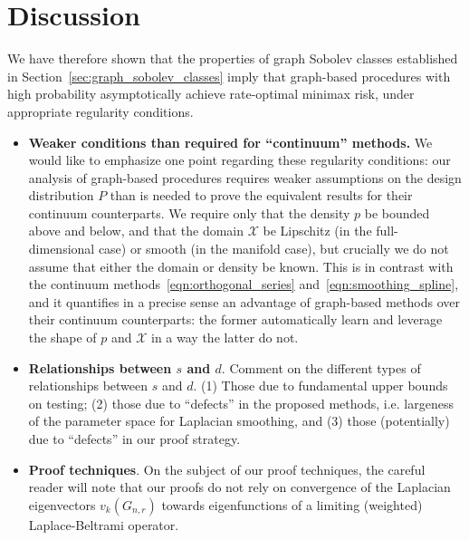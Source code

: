 \documentclass{article}
\newcommand{\1}{\mathbf{1}}
\newcommand{\Xset}{\mathcal{X}}
\theoremstyle{alden}
\theoremstyle{aldenthm}
\theoremstyle{definition}
\theoremstyle{remark}
\begin{document}
\section{Discussion}
\label{sec:discussion}
We have therefore shown that the properties of graph Sobolev classes established in Section~\ref{sec:graph_sobolev_classes} imply that graph-based procedures with high probability asymptotically achieve rate-optimal minimax risk, under appropriate regularity conditions. 
\begin{itemize}
	\item \textbf{Weaker conditions than required for ``continuum'' methods.}  We would like to emphasize one point regarding these regularity conditions: our analysis of graph-based procedures requires weaker assumptions on the design distribution $P$ than is needed to prove the equivalent results for their continuum counterparts. We require only that the density $p$ be bounded above and below, and that the domain $\Xset$ be Lipschitz (in the full-dimensional case) or smooth (in the manifold case), but crucially we do not assume that either the domain or density be known. This is in contrast with the continuum methods~\eqref{eqn:orthogonal_series} and~\eqref{eqn:smoothing_spline}, and it quantifies in a precise sense an advantage of graph-based methods over their continuum counterparts: the former automatically learn and leverage the shape of $p$ and $\Xset$ in a way the latter do not.
	\item \textbf{Relationships between $s$ and $d$}. Comment on the different types of relationships between $s$ and $d$. (1) Those due to fundamental upper bounds on testing; (2) those due to ``defects'' in the proposed methods, i.e. largeness of the parameter space for Laplacian smoothing, and (3) those (potentially) due to ``defects'' in our proof strategy.
	\item \textbf{Proof techniques}. On the subject of our proof techniques, the careful reader will note that our proofs do not rely on convergence of the Laplacian eigenvectors $v_k(G_{n,r})$ towards eigenfunctions of a limiting (weighted) Laplace-Beltrami operator.
	

\end{itemize}
\end{document}
